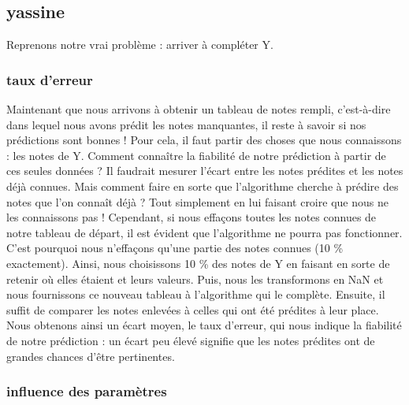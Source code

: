 \documentclass[a4paper,10pt]{article}
\begin{document}
\subsection{yassine}

Reprenons notre vrai problème : arriver à compléter Y.

\subsubsection{taux d'erreur}
Maintenant que nous arrivons à obtenir un tableau de notes rempli, c'est-à-dire dans lequel nous avons prédit les notes manquantes, il reste à savoir si nos prédictions sont bonnes !
Pour cela, il faut partir des choses que nous connaissons : les notes de Y. 
Comment connaître la fiabilité de notre prédiction à partir de ces seules données ?  
Il faudrait mesurer l'écart entre les notes prédites et les notes déjà connues.
Mais comment faire en sorte que l'algorithme cherche à prédire des notes que l'on connaît déjà ?
Tout simplement en lui faisant croire que nous ne les connaissons pas !
Cependant, si nous effaçons toutes les notes connues de notre tableau de départ, il est évident que l'algorithme ne pourra pas fonctionner.
C'est pourquoi nous n'effaçons qu'une partie des notes connues (10 \% exactement). 
Ainsi, nous choisissons 10 \% des notes de Y en faisant en sorte de retenir où elles étaient et leurs valeurs. 
Puis, nous les transformons en NaN et nous fournissons ce nouveau tableau à l'algorithme qui le complète. 
Ensuite, il suffit de comparer les notes enlevées à celles qui ont été prédites à leur place. 
Nous obtenons ainsi un écart moyen, le taux d'erreur, qui nous indique la fiabilité de notre prédiction : 
un écart peu élevé signifie que les notes prédites ont de grandes chances d'être pertinentes.

\subsubsection{influence des paramètres}
\end{document}

